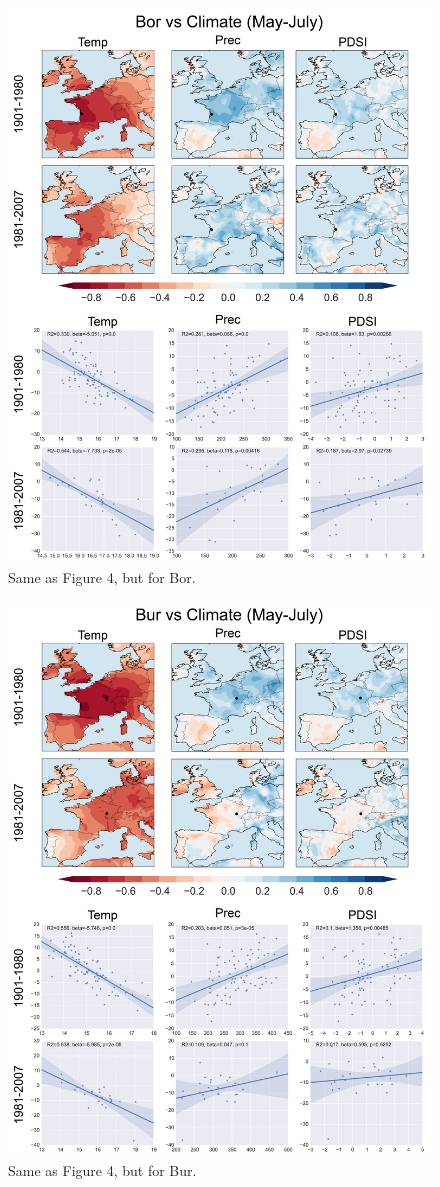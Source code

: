 \documentclass[12pt]{article}
\begin{document}
\begin{figure}
\center
\includegraphics[width=.9\columnwidth,scale=2]{SUPP_fig_05_Bor_MJJ_climate.png}
\caption{Same as Figure 4, but for Bor.}
\end{figure}

\begin{figure}
\center
\includegraphics[width=.9\columnwidth,scale=2]{SUPP_fig_06_Bur_MJJ_climate.png}
\caption{Same as Figure 4, but for Bur.}
\end{figure}
\end{document}
